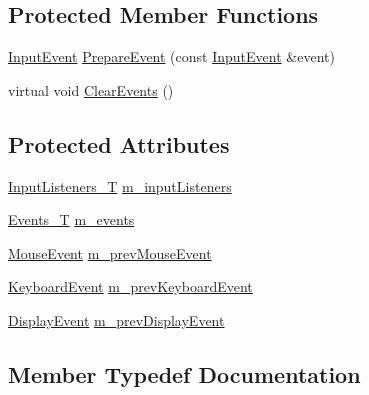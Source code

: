 \subsection*{Protected Member Functions}
\begin{DoxyCompactItemize}
\item 
\mbox{\hyperlink{structec_1_1_input_event}{Input\+Event}} \mbox{\hyperlink{classec_1_1_input_observable_a99d0fa147a66bf09c7bedaa3d556cee2}{Prepare\+Event}} (const \mbox{\hyperlink{structec_1_1_input_event}{Input\+Event}} \&event)
\item 
virtual void \mbox{\hyperlink{classec_1_1_input_observable_a5af16f48a5bdca46229a6b5bc7769e2d}{Clear\+Events}} ()
\end{DoxyCompactItemize}
\subsection*{Protected Attributes}
\begin{DoxyCompactItemize}
\item 
\mbox{\hyperlink{classec_1_1_input_observable_a99717b2918621597db89d9ede34ddded}{Input\+Listeners\+\_\+T}} \mbox{\hyperlink{classec_1_1_input_observable_aa11756df5cac4e93ace9db3f6c8817c4}{m\+\_\+input\+Listeners}}
\item 
\mbox{\hyperlink{classec_1_1_input_observable_a9b63c8acbcbfc0f99d2964493ac52925}{Events\+\_\+T}} \mbox{\hyperlink{classec_1_1_input_observable_af83e9f99bec60cdce82b129fa457c6ab}{m\+\_\+events}}
\item 
\mbox{\hyperlink{structec_1_1_mouse_event}{Mouse\+Event}} \mbox{\hyperlink{classec_1_1_input_observable_a99e8c1484fe87503096e681d8bd3b75f}{m\+\_\+prev\+Mouse\+Event}}
\item 
\mbox{\hyperlink{structec_1_1_keyboard_event}{Keyboard\+Event}} \mbox{\hyperlink{classec_1_1_input_observable_acf14cdeb5a394fbd296ff3dfb391c14f}{m\+\_\+prev\+Keyboard\+Event}}
\item 
\mbox{\hyperlink{structec_1_1_display_event}{Display\+Event}} \mbox{\hyperlink{classec_1_1_input_observable_ae480593ec25d98ea00b0b7a9aa6cba32}{m\+\_\+prev\+Display\+Event}}
\end{DoxyCompactItemize}


\subsection{Member Typedef Documentation}
\mbox{\label{classec_1_1_input_observable_a9b63c8acbcbfc0f99d2964493ac52925}} 
